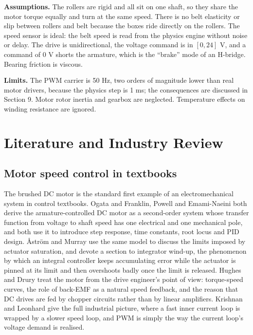 \documentclass[12pt,a4paper]{article}
\begin{document}
\textbf{Assumptions.} The rollers are rigid and all sit on one shaft, so they share the motor torque equally and turn at the same speed. There is no belt elasticity or slip between rollers and belt because the boxes ride directly on the rollers. The speed sensor is ideal: the belt speed is read from the physics engine without noise or delay. The drive is unidirectional, the voltage command is in $[0, 24]$ V, and a command of 0 V shorts the armature, which is the ``brake'' mode of an H-bridge. Bearing friction is viscous.

\textbf{Limits.} The PWM carrier is 50 Hz, two orders of magnitude lower than real motor drivers, because the physics step is 1 ms; the consequences are discussed in Section 9. Motor rotor inertia and gearbox are neglected. Temperature effects on winding resistance are ignored.

\section{Literature and Industry Review}

\subsection{Motor speed control in textbooks}

The brushed DC motor is the standard first example of an electromechanical system in control textbooks. Ogata \cite{ogata} and Franklin, Powell and Emami-Naeini \cite{franklin} both derive the armature-controlled DC motor as a second-order system whose transfer function from voltage to shaft speed has one electrical and one mechanical pole, and both use it to introduce step response, time constants, root locus and PID design. Åström and Murray \cite{astrom-murray} use the same model to discuss the limits imposed by actuator saturation, and devote a section to integrator wind-up, the phenomenon by which an integral controller keeps accumulating error while the actuator is pinned at its limit and then overshoots badly once the limit is released. Hughes and Drury \cite{hughes} treat the motor from the drive engineer's point of view: torque-speed curves, the role of back-EMF as a natural speed feedback, and the reason that DC drives are fed by chopper circuits rather than by linear amplifiers. Krishnan \cite{krishnan} and Leonhard \cite{leonhard} give the full industrial picture, where a fast inner current loop is wrapped by a slower speed loop, and PWM is simply the way the current loop's voltage demand is realised.
\end{document}
